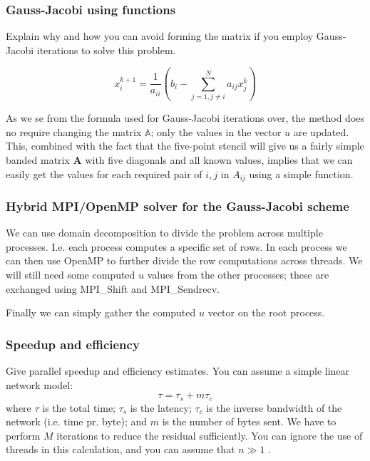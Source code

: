 \subsubsection{Gauss-Jacobi using functions} %
\label{ssub:gauss_jacobi_using_functions}


\begin{question}
  Explain why and how you can avoid forming the matrix if you employ Gauss-Jacobi iterations to solve this problem.
\end{question}

\begin{equation}
  x_i^{k+1} = \frac{1}{a_{ii}} \left( b_i - \sum_{j=1, j\neq i}^N a_{ij} x_j^k \right) \label{eq:gauss_seidel}
\end{equation}

As we se from the formula used for Gauss-Jacobi iterations over, the method does no require changing the matrix $\mathbb{A}$; only the values in the vector $u$ are updated. This, combined with the fact that the five-point stencil will give us a fairly simple banded matrix $\mathbf{A}$ with five diagonals and all known values, implies that we can easily get the values for each required pair of $i,j$ in $A_{ij}$ using a simple function.

\subsubsection{Hybrid MPI/OpenMP solver for the Gauss-Jacobi scheme} %
\label{ssub:hybrid_mpi_openmp_solver_for_the_gauss_jacobi_scheme}
We can use domain decomposition to divide the problem across multiple processes. I.e. each process computes a specific set of rows. In each process we can then use OpenMP to further divide the row computations across threads. We will still need some computed $u$ values from the other processes; these are exchanged using MPI\_Shift and MPI\_Sendrecv.

Finally we can simply gather the computed $u$ vector on the root process.

\subsubsection{Speedup and efficiency} %
\label{ssub:speedup_and_efficiency}


\begin{question}
  Give parallel speedup and efficiency estimates. You can assume a simple linear network model:
  \begin{equation}
    \nonumber
    \tau = \tau_s + m\tau_c
  \end{equation}
  where $\tau$ is the total time; $\tau_s$ is the latency; $\tau_c$ is the inverse bandwidth of the network (i.e. time pr. byte); and $m$ is the number of bytes sent. We have to perform $M$ iterations to reduce the residual sufficiently. You can ignore the use of threads in this calculation, and you can assume that $n \gg 1$ .
\end{question}

